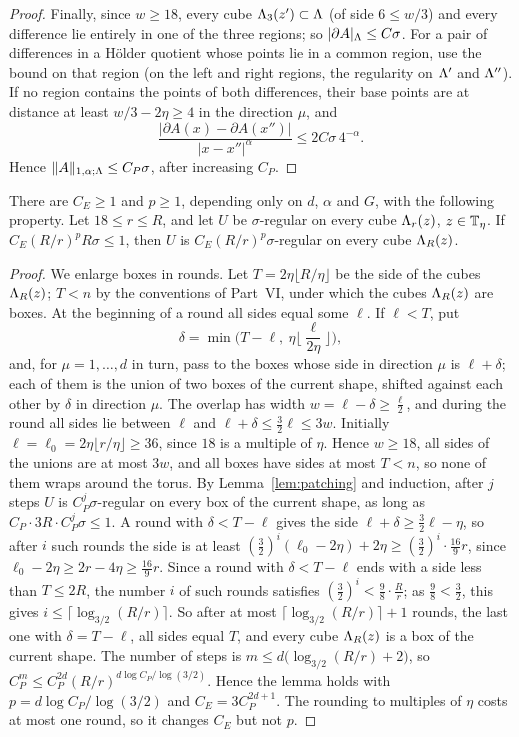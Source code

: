 \begin{proof}
Finally, since $w\ge18$, every cube $\Lambda_3(z')\subset\Lambda$ (of side $6\le w/3$) and every difference lie entirely in one of the three regions; so $|\partial A|_\Lambda\le C\sigma$. For a pair of differences in a H\"older quotient whose points lie in a common region, use the bound on that region (on the left and right regions, the regularity on $\Lambda'$ and $\Lambda''$). If no region contains the points of both differences, their base points are at distance at least $w/3-2\eta\ge4$ in the direction $\mu$, and
\[
\frac{|\partial A(x)-\partial A(x'')|}{|x-x''|^\alpha}\le2C\sigma\,4^{-\alpha}.
\]
Hence $\|A\|_{1,\alpha;\Lambda}\le C_P\sigma$, after increasing $C_P$.
\end{proof}

\begin{lemma}\label{lem:large-cubes}
There are $C_E\ge1$ and $p\ge1$, depending only on $d$, $\alpha$ and $G$, with the following property. Let $18\le r\le R$, and let $U$ be $\sigma$-regular on every cube $\Lambda_r(z)$, $z\in\mathbb T_\eta$. If $C_E(R/r)^pR\sigma\le1$, then $U$ is $C_E(R/r)^p\sigma$-regular on every cube $\Lambda_R(z)$.
\end{lemma}

\begin{proof}
We enlarge boxes in rounds. Let $T=2\eta\lfloor R/\eta\rfloor$ be the side of the cubes $\Lambda_R(z)$; $T<n$ by the conventions of Part~VI, under which the cubes $\Lambda_R(z)$ are boxes. At the beginning of a round all sides equal some $\ell$. If $\ell<T$, put
\[
\delta=\min\Big(T-\ell,\ \eta\Big\lfloor\frac{\ell}{2\eta}\Big\rfloor\Big),
\]
and, for $\mu=1,\dots,d$ in turn, pass to the boxes whose side in direction $\mu$ is $\ell+\delta$; each of them is the union of two boxes of the current shape, shifted against each other by $\delta$ in direction $\mu$. The overlap has width $w=\ell-\delta\ge\frac\ell2$, and during the round all sides lie between $\ell$ and $\ell+\delta\le\frac32\ell\le3w$. Initially $\ell=\ell_0=2\eta\lfloor r/\eta\rfloor\ge36$, since $18$ is a multiple of $\eta$. Hence $w\ge18$, all sides of the unions are at most $3w$, and all boxes have sides at most $T<n$, so none of them wraps around the torus. By Lemma~\ref{lem:patching} and induction, after $j$ steps $U$ is $C_P^j\sigma$-regular on every box of the current shape, as long as $C_P\cdot3R\cdot C_P^j\sigma\le1$. A round with $\delta<T-\ell$ gives the side $\ell+\delta\ge\frac32\ell-\eta$, so after $i$ such rounds the side is at least $(\frac32)^i(\ell_0-2\eta)+2\eta\ge(\frac32)^i\cdot\frac{16}9r$, since $\ell_0-2\eta\ge2r-4\eta\ge\frac{16}9r$. Since a round with $\delta<T-\ell$ ends with a side less than $T\le2R$, the number $i$ of such rounds satisfies $(\frac32)^i<\frac98\cdot\frac Rr$; as $\frac98<\frac32$, this gives $i\le\lceil\log_{3/2}(R/r)\rceil$. So after at most $\lceil\log_{3/2}(R/r)\rceil+1$ rounds, the last one with $\delta=T-\ell$, all sides equal $T$, and every cube $\Lambda_R(z)$ is a box of the current shape. The number of steps is $m\le d\big(\log_{3/2}(R/r)+2\big)$, so $C_P^m\le C_P^{2d}(R/r)^{d\log C_P/\log(3/2)}$. Hence the lemma holds with $p=d\log C_P/\log(3/2)$ and $C_E=3C_P^{2d+1}$. The rounding to multiples of $\eta$ costs at most one round, so it changes $C_E$ but not $p$.
\end{proof}


